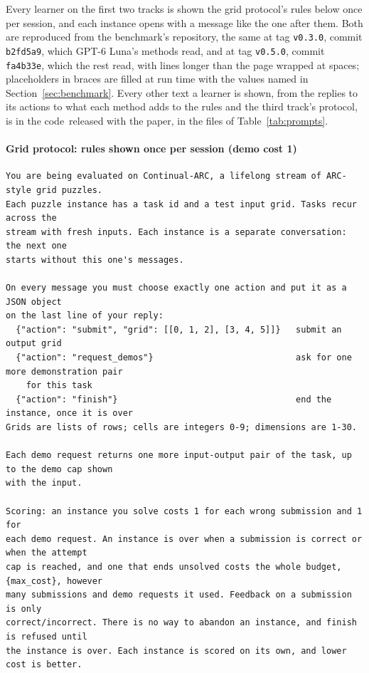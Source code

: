 
Every learner on the first two tracks is shown the grid protocol's rules below once per session, and each instance opens with a message like the one after them. Both are reproduced from the benchmark's repository, the same at tag \texttt{v0.3.0}, commit \texttt{b2fd5a9}, which GPT-6 Luna's methods read, and at tag \texttt{v0.5.0}, commit \texttt{fa4b33e}, which the rest read, with lines longer than the page wrapped at spaces; placeholders in braces are filled at run time with the values named in Section~\ref{sec:benchmark}. Every other text a learner is shown, from the replies to its actions to what each method adds to the rules and the third track's protocol, is in the code\ released with the paper, in the files of Table~\ref{tab:prompts}.

\paragraph{Grid protocol: rules shown once per session (demo cost 1)}
\begin{scriptsize}\begin{verbatim}
You are being evaluated on Continual-ARC, a lifelong stream of ARC-style grid puzzles.
Each puzzle instance has a task id and a test input grid. Tasks recur across the
stream with fresh inputs. Each instance is a separate conversation: the next one
starts without this one's messages.

On every message you must choose exactly one action and put it as a JSON object
on the last line of your reply:
  {"action": "submit", "grid": [[0, 1, 2], [3, 4, 5]]}   submit an output grid
  {"action": "request_demos"}                            ask for one more demonstration pair
    for this task
  {"action": "finish"}                                   end the instance, once it is over
Grids are lists of rows; cells are integers 0-9; dimensions are 1-30.

Each demo request returns one more input-output pair of the task, up to the demo cap shown
with the input.

Scoring: an instance you solve costs 1 for each wrong submission and 1 for
each demo request. An instance is over when a submission is correct or when the attempt
cap is reached, and one that ends unsolved costs the whole budget, {max_cost}, however
many submissions and demo requests it used. Feedback on a submission is only
correct/incorrect. There is no way to abandon an instance, and finish is refused until
the instance is over. Each instance is scored on its own, and lower cost is better.
\end{verbatim}\end{scriptsize}

